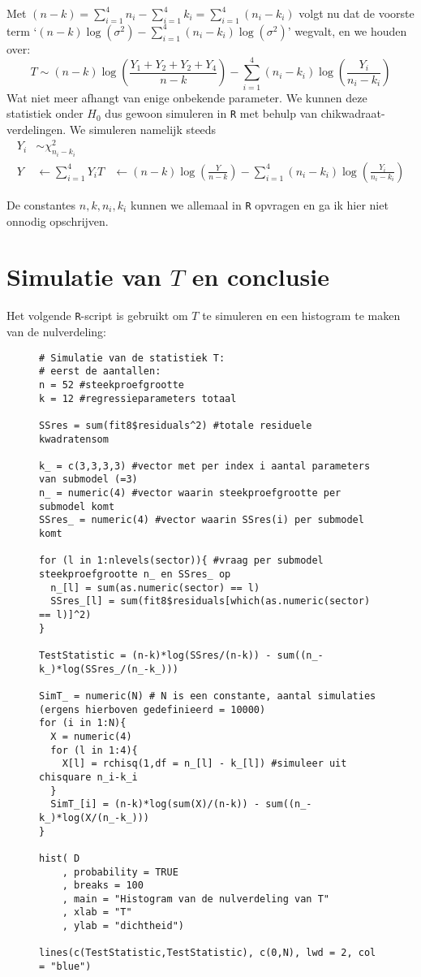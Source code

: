 \documentclass[a4paper]{report}
\begin{document}
  Met $(n-k) = \sum_{i=1}^4 n_i - \sum_{i=1}^4 k_i = \sum_{i=1}^4 (n_i-k_i)$ volgt nu dat de voorste term `$(n-k)\log(\sigma^2) - \sum_{i=1}^4 (n_i-k_i)\log(\sigma^2)$' wegvalt, en we houden over:
  \begin{equation}
  T \sim (n-k)\log\left(\frac{Y_1+Y_2+Y_2+Y_4}{n-k}\right) - \sum_{i=1}^4 (n_i-k_i)\log\left(\frac{Y_i}{n_i-k_i}\right)
  \end{equation}
  Wat niet meer afhangt van enige onbekende parameter. We kunnen deze statistiek onder $H_0$ dus gewoon simuleren in \verb!R! met behulp van chikwadraat-verdelingen. We simuleren namelijk steeds 
  \begin{align*}
  Y_i &\sim \chi^2_{n_i-k_i} \\
  Y &\leftarrow \sum_{i=1}^4 Y_i
  T &\leftarrow (n-k)\log\left(\frac{Y}{n-k}\right) - \sum_{i=1}^4 (n_i-k_i)\log\left(\frac{Y_i}{n_i-k_i}\right)
  \end{align*}
   
  De constantes $n,k,n_i,k_i$ kunnen we allemaal in \verb!R! opvragen en ga ik hier niet onnodig opschrijven.
  
\section{Simulatie van $T$ en conclusie}
  Het volgende \verb!R!-script is gebruikt om $T$ te simuleren en een histogram te maken van de nulverdeling:
  
  \begin{figure}[H]
  \begin{verbatim}
# Simulatie van de statistiek T:
# eerst de aantallen:
n = 52 #steekproefgrootte
k = 12 #regressieparameters totaal

SSres = sum(fit8$residuals^2) #totale residuele kwadratensom

k_ = c(3,3,3,3) #vector met per index i aantal parameters van submodel (=3)
n_ = numeric(4) #vector waarin steekproefgrootte per submodel komt
SSres_ = numeric(4) #vector waarin SSres(i) per submodel komt

for (l in 1:nlevels(sector)){ #vraag per submodel steekproefgrootte n_ en SSres_ op
  n_[l] = sum(as.numeric(sector) == l)
  SSres_[l] = sum(fit8$residuals[which(as.numeric(sector) == l)]^2)
}

TestStatistic = (n-k)*log(SSres/(n-k)) - sum((n_-k_)*log(SSres_/(n_-k_)))

SimT_ = numeric(N) # N is een constante, aantal simulaties (ergens hierboven gedefinieerd = 10000)
for (i in 1:N){
  X = numeric(4)
  for (l in 1:4){
    X[l] = rchisq(1,df = n_[l] - k_[l]) #simuleer uit chisquare n_i-k_i
  }
  SimT_[i] = (n-k)*log(sum(X)/(n-k)) - sum((n_-k_)*log(X/(n_-k_)))
}

hist( D
    , probability = TRUE
    , breaks = 100
    , main = "Histogram van de nulverdeling van T"
    , xlab = "T"
    , ylab = "dichtheid")

lines(c(TestStatistic,TestStatistic), c(0,N), lwd = 2, col = "blue") 
  \end{verbatim}
  \end{figure}
  
\end{document}
